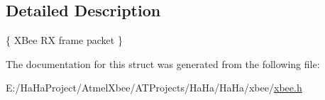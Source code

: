 \subsection{Detailed Description}
\{ X\+Bee RX frame packet \} 

The documentation for this struct was generated from the following file\+:\begin{DoxyCompactItemize}
\item 
E\+:/\+Ha\+Ha\+Project/\+Atmel\+Xbee/\+A\+T\+Projects/\+Ha\+Ha/\+Ha\+Ha/xbee/\hyperlink{xbee_8h}{xbee.\+h}\end{DoxyCompactItemize}
